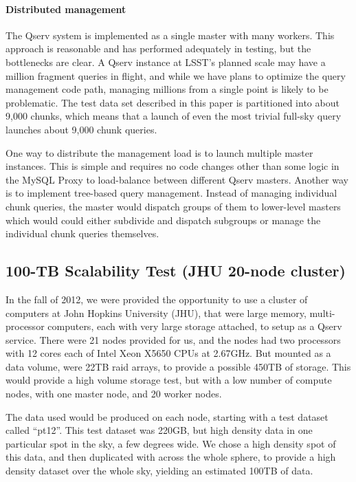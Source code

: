 \documentclass[DM,lsstdraft,toc]{lsstdoc}
\begin{document}
\paragraph{Distributed management}\label{distributed-management}

The Qserv system is implemented as a single master with many workers.
This approach is reasonable and has performed adequately in testing, but
the bottlenecks are clear. A Qserv instance at LSST's planned scale may
have a million fragment queries in flight, and while we have plans to
optimize the query management code path, managing millions from a single
point is likely to be problematic. The test data set described in this
paper is partitioned into about 9,000 chunks, which means that a launch
of even the most trivial full-sky query launches about 9,000 chunk
queries.

One way to distribute the management load is to launch multiple master
instances. This is simple and requires no code changes other than some
logic in the MySQL Proxy to load-balance between different Qserv
masters. Another way is to implement tree-based query management.
Instead of managing individual chunk queries, the master would dispatch
groups of them to lower-level masters which would could either subdivide
and dispatch subgroups or manage the individual chunk queries
themselves.

\subsection{100-TB Scalability Test (JHU 20-node
cluster)}\label{tb-scalability-test-jhu-20-node-cluster}

In the fall of 2012, we were provided the opportunity to use a cluster
of computers at John Hopkins University (JHU), that were large memory,
multi-processor computers, each with very large storage attached, to
setup as a Qserv service. There were 21 nodes provided for us, and the
nodes had two processors with 12 cores each of Intel Xeon X5650 CPUs at
2.67GHz. But mounted as a data volume, were 22TB raid arrays, to provide
a possible 450TB of storage. This would provide a high volume storage
test, but with a low number of compute nodes, with one master node, and
20 worker nodes.

The data used would be produced on each node, starting with a test
dataset called ``pt12''. This test dataset was 220GB, but high density
data in one particular spot in the sky, a few degrees wide. We chose a
high density spot of this data, and then duplicated with across the
whole sphere, to provide a high density dataset over the whole sky,
yielding an estimated 100TB of data.
\end{document}
